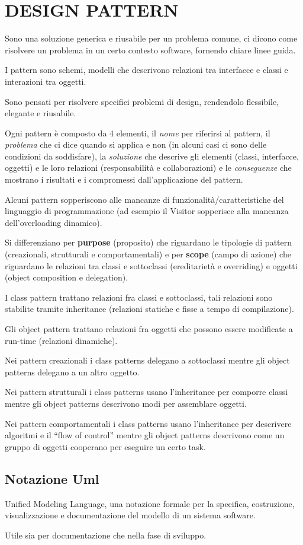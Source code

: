 \chapter{DESIGN PATTERN}

Sono una soluzione generica e riusabile per un problema comune, ci dicono come risolvere un problema in un certo contesto software, fornendo chiare linee guida.

I pattern sono schemi, modelli che descrivono relazioni tra interfacce e classi e interazioni tra oggetti. 

Sono pensati per risolvere specifici problemi di design, rendendolo flessibile, elegante e riusabile. 

Ogni pattern è composto da 4 elementi, il \textit{nome} per riferirsi al pattern, il \textit{problema} che ci dice quando si applica e non (in alcuni casi ci sono delle condizioni da soddisfare), la \textit{soluzione} che descrive gli elementi (classi, interfacce, oggetti) e le loro relazioni (responsabilità e collaborazioni) e le \textit{conseguenze} che mostrano i risultati e i compromessi dall’applicazione del pattern.

Alcuni pattern sopperiscono alle mancanze di funzionalità/caratteristiche del linguaggio di programmazione (ad esempio il Visitor sopperisce alla mancanza dell'overloading dinamico).

Si differenziano per \textbf{purpose} (proposito) che riguardano le tipologie di pattern (creazionali, strutturali e comportamentali) e per \textbf{scope} (campo di azione) che riguardano le relazioni tra classi e sottoclassi (ereditarietà e overriding) e oggetti (object composition e delegation).

I class pattern trattano relazioni fra classi e sottoclassi, tali relazioni sono stabilite tramite inheritance (relazioni statiche e fisse a tempo di compilazione).

Gli object pattern trattano relazioni fra oggetti che possono essere modificate a run-time (relazioni dinamiche).

Nei pattern creazionali i class patterns delegano a sottoclassi mentre gli object patterns delegano a un altro oggetto.

Nei pattern strutturali i class patterns usano l’inheritance per comporre classi mentre gli object patterns descrivono modi per assemblare oggetti.

Nei pattern comportamentali i class patterns usano l’inheritance per descrivere algoritmi e il “flow of control” mentre gli object patterns descrivono come un gruppo di oggetti cooperano per eseguire un certo task.

\section{Notazione Uml}

Unified Modeling Language, una notazione formale per la specifica, costruzione, visualizzazione e documentazione del modello di un sistema software.

Utile sia per documentazione che nella fase di sviluppo.